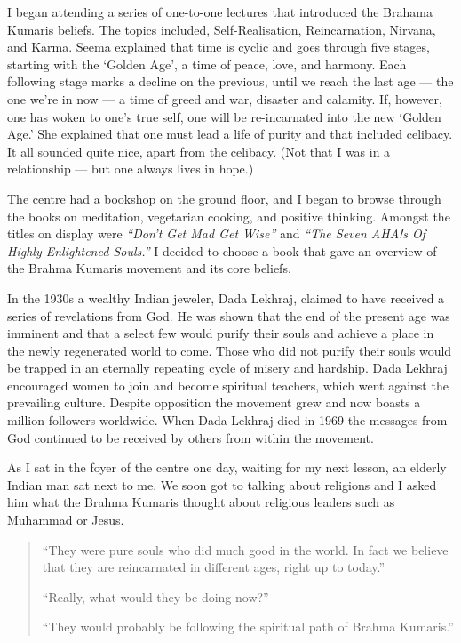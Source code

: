 \documentclass[12pt]{memoir}
\newcommand{\cor}[2]{#2} %
\def\–{-\hskip0pt}
\begin{document}
I began attending a series of one-to-one lectures
that introduced the Brahama Kumaris beliefs.
The topics included, Self\–Realisation, Reincarnation, Nirvana, and Karma.
Seema explained that time is cyclic and goes through five stages,
starting with the ‘Golden Age’, a time of peace, love, and harmony.
Each following stage marks a decline on the previous,
until we reach the last age — the one we’re in now —
a time of greed and war, disaster and calamity.
If, however, one has woken to one’s true self,
one will be re-incarnated into the new ‘Golden Age.’
She explained that one must lead a life of purity and that included celibacy.
It all sounded quite nice, apart from the celibacy.
(Not that I was in a relationship — but one always lives in hope.)

The centre had a bookshop on the ground floor,
and I began to browse through the books on meditation, vegetarian cooking,
and positive thinking.
Amongst the title\cor{’}{}s on display were \emph{“Don’t Get Mad Get Wise”}
and \emph{“The Seven AHA!s Of Highly Enlightened Souls.”}\@
I decided to choose a book that gave an overview
of the Brahma Kumaris movement and its core beliefs.

In the 1930s a wealthy Indian jeweler, Dada Lekhraj,
claimed to have received a series of revelations from God.
He was shown that the end of the present age was imminent
and that a select few would purify their souls
and achieve a place in the newly regenerated world to come.
Those who did not purify their souls would be trapped
in an eternally repeating cycle of misery and hardship.
Dada Lekhraj encouraged women to join and become spiritual teachers,
which went against the prevailing culture.
Despite opposition the movement grew
and now boasts a million followers worldwide.
When Dada Lekhraj died in 1969 the messages from God continued
to be received by others from within the movement.

As I sat in the foyer of the centre one day, waiting for my next lesson,
an elderly Indian man sat next to me.
We soon got to talking about religions and I asked him what the Brahma Kumaris
thought about religious leaders such as Muhammad or Jesus.

\begin{quote}
“They were pure souls who did much good in the world.
In fact we believe that they are reincarnated in different ages,
right up to today.”

“Really, what would they be doing now?”

“They would probably be following the spiritual path of Brahma Kumaris.”
\end{quote}
\end{document}
